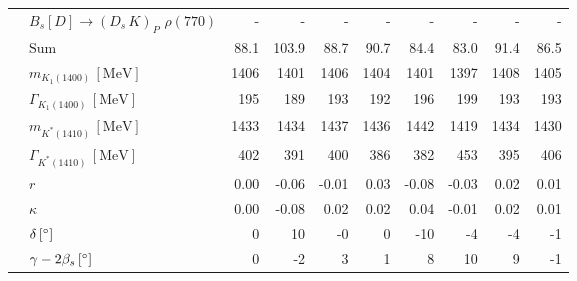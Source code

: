 \begin{tabular}{l l  r  r  r  r  r  r  r  r  }
 & $B_s[D] \to ( D_s \, K)_{P} \, \, \rho(770)$ & -  & -  & -  & -  & -  & -  & -  & -  \\ 
 & $\text{Sum}$ & 88.1 & 103.9 & 88.7 & 90.7 & 84.4 & 83.0 & 91.4 & 86.5 \\ 
\hline
 & $m_{K_1(1400)} \, [\text{MeV}]$ & 1406 & 1401 & 1406 & 1404 & 1401 & 1397 & 1408 & 1405 \\ 
 & $\Gamma_{K_1(1400)} \, [\text{MeV}]$ & 195 & 189 & 193 & 192 & 196 & 199 & 193 & 193 \\ 
 & $m_{K^{*}(1410)} \, [\text{MeV}]$ & 1433 & 1434 & 1437 & 1436 & 1442 & 1419 & 1434 & 1430 \\ 
 & $\Gamma_{K^{*}(1410)} \, [\text{MeV}]$ & 402 & 391 & 400 & 386 & 382 & 453 & 395 & 406 \\ 
 & $r$ & 0.00 & -0.06 & -0.01 & 0.03 & -0.08 & -0.03 & 0.02 & 0.01 \\ 
 & $\kappa$ & 0.00 & -0.08 & 0.02 & 0.02 & 0.04 & -0.01 & 0.02 & 0.01 \\ 
 & $\delta \, [^{\circ}]$ & 0 & 10 & -0 & 0 & -10 & -4 & -4 & -1 \\ 
 & $\gamma - 2 \beta_{s} \, [^{\circ}]$ & 0 & -2 & 3 & 1 & 8 & 10 & 9 & -1 \\ 
\hline
\hline
\end{tabular}
